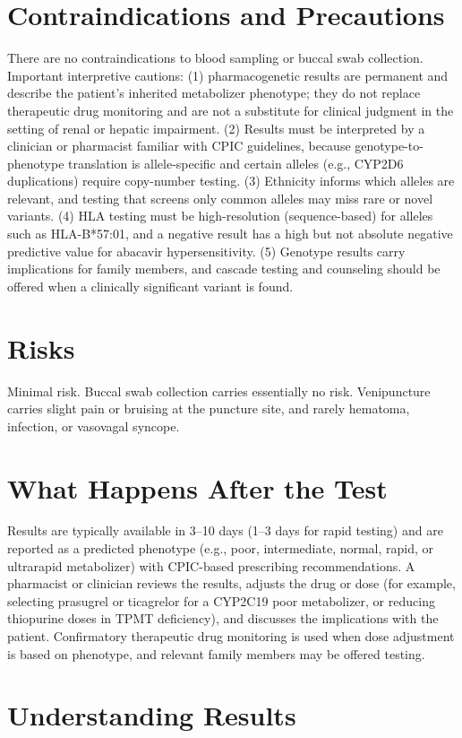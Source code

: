 \section*{Contraindications and Precautions}
There are no contraindications to blood sampling or buccal swab collection. Important interpretive cautions: (1) pharmacogenetic results are permanent and describe the patient's inherited metabolizer phenotype; they do not replace therapeutic drug monitoring and are not a substitute for clinical judgment in the setting of renal or hepatic impairment. (2) Results must be interpreted by a clinician or pharmacist familiar with CPIC guidelines, because genotype-to-phenotype translation is allele-specific and certain alleles (e.g., CYP2D6 duplications) require copy-number testing. (3) Ethnicity informs which alleles are relevant, and testing that screens only common alleles may miss rare or novel variants. (4) HLA testing must be high-resolution (sequence-based) for alleles such as HLA-B*57:01, and a negative result has a high but not absolute negative predictive value for abacavir hypersensitivity. (5) Genotype results carry implications for family members, and cascade testing and counseling should be offered when a clinically significant variant is found.

\section*{Risks}
Minimal risk. Buccal swab collection carries essentially no risk. Venipuncture carries slight pain or bruising at the puncture site, and rarely hematoma, infection, or vasovagal syncope.

\section*{What Happens After the Test}
Results are typically available in 3--10 days (1--3 days for rapid testing) and are reported as a predicted phenotype (e.g., poor, intermediate, normal, rapid, or ultrarapid metabolizer) with CPIC-based prescribing recommendations. A pharmacist or clinician reviews the results, adjusts the drug or dose (for example, selecting prasugrel or ticagrelor for a CYP2C19 poor metabolizer, or reducing thiopurine doses in TPMT deficiency), and discusses the implications with the patient. Confirmatory therapeutic drug monitoring is used when dose adjustment is based on phenotype, and relevant family members may be offered testing.

\section*{Understanding Results}

